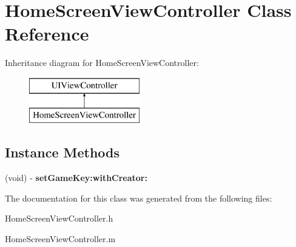 \hypertarget{interface_home_screen_view_controller}{\section{Home\+Screen\+View\+Controller Class Reference}
\label{interface_home_screen_view_controller}
}
Inheritance diagram for Home\+Screen\+View\+Controller\+:\begin{figure}[H]
\begin{center}
\leavevmode
\includegraphics[height=2.000000cm]{interface_home_screen_view_controller}
\end{center}
\end{figure}
\subsection*{Instance Methods}
\begin{DoxyCompactItemize}
\item 
\hypertarget{interface_home_screen_view_controller_a073239b70f62cc79c30c71da21376ba3}{(void) -\/ {\bfseries set\+Game\+Key\+:with\+Creator\+:}}\label{interface_home_screen_view_controller_a073239b70f62cc79c30c71da21376ba3}

\end{DoxyCompactItemize}


The documentation for this class was generated from the following files\+:\begin{DoxyCompactItemize}
\item 
Home\+Screen\+View\+Controller.\+h\item 
Home\+Screen\+View\+Controller.\+m\end{DoxyCompactItemize}

